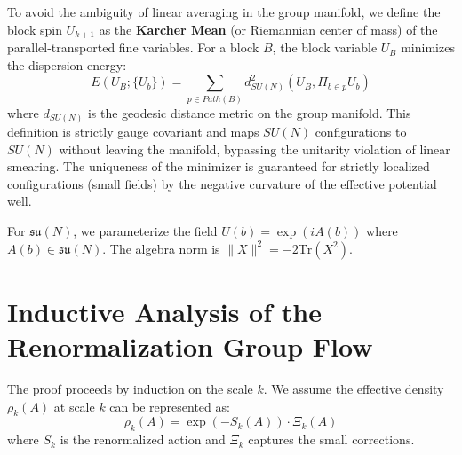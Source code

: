 \begin{definition}
To avoid the ambiguity of linear averaging in the group manifold, we define the block spin $U_{k+1}$ as the \textbf{Karcher Mean} (or Riemannian center of mass) of the parallel-transported fine variables.
For a block $B$, the block variable $U_{B}$ minimizes the dispersion energy:
\begin{equation}
E(U_B; \{U_b\}) = \sum_{p \in Path(B)} d_{SU(N)}^2(U_B, \Pi_{b \in p} U_b)
\end{equation}
where $d_{SU(N)}$ is the geodesic distance metric on the group manifold.
This definition is strictly gauge covariant and maps $SU(N)$ configurations to $SU(N)$ without leaving the manifold, bypassing the unitarity violation of linear smearing.
The uniqueness of the minimizer is guaranteed for strictly localized configurations (small fields) by the negative curvature of the effective potential well.
\end{definition}

For $\mathfrak{su}(N)$, we parameterize the field $U(b) = \exp(i A(b))$ where $A(b) \in \mathfrak{su}(N)$.
The algebra norm is $\|X\|^2 = -2 \text{Tr}(X^2)$.

\section{Inductive Analysis of the Renormalization Group Flow}

The proof proceeds by induction on the scale $k$. We assume the effective density $\rho_k(A)$ at scale $k$ can be represented as:
\begin{equation}
\rho_k(A) = \exp(-S_k(A)) \cdot \Xi_k(A)
\end{equation}
where $S_k$ is the renormalized action and $\Xi_k$ captures the small corrections.

